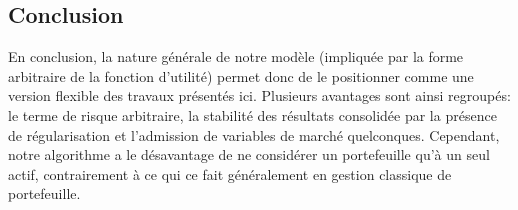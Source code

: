 \subsection{Conclusion}


En conclusion, la nature générale de notre modèle (impliquée par la forme arbitraire de la
fonction d'utilité) permet donc de le positionner comme une version flexible des travaux
présentés ici. Plusieurs avantages sont ainsi regroupés: le terme de risque arbitraire, la
stabilité des résultats consolidée par la présence de régularisation et l'admission de
variables de marché quelconques. Cependant, notre algorithme a le désavantage de ne
considérer un portefeuille qu'à un seul actif, contrairement à ce qui ce fait généralement
en gestion classique de portefeuille.


